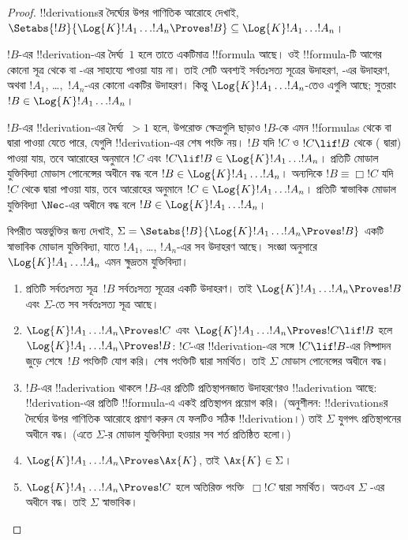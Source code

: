 \documentclass[../../../include/open-logic-section]{subfiles}
\begin{document}
\begin{proof}
  !!{derivation}sর দৈর্ঘ্যের উপর গাণিতিক আরোহে দেখাই,
  $\Setabs{!B}{\Log{K} !A_1 \dots !A_n \Proves !B} \subseteq
  \Log{K} !A_1 \dots !A_n$।

  $!B$-এর !!{derivation}-এর দৈর্ঘ্য~$1$ হলে তাতে একটিমাত্র !!{formula} আছে। ওই !!{formula}-টি আগের কোনো সূত্র থেকে \MP{} বা \Nec{}-এর সাহায্যে পাওয়া যায় না। তাই সেটি অবশ্যই সর্বতঃসত্য সূত্রের উদাহরণ, -এর উদাহরণ, অথবা $!A_1$, \dots,~$!A_n$-এর কোনো একটির উদাহরণ। কিন্তু $\Log{K}!A_1\dots!A_n$-তেও এগুলি আছে; সুতরাং $!B \in \Log{K}!A_1 \dots !A_n$।

  $!B$-এর !!{derivation}-এর দৈর্ঘ্য~$> 1$ হলে, উপরোক্ত ক্ষেত্রগুলি ছাড়াও $!B$-কে এমন !!{formula}s থেকে \MP{} বা \Nec{} দ্বারা পাওয়া যেতে পারে, যেগুলি !!{derivation}-এর শেষ পংক্তি নয়। $!B$ যদি $!C$ ও $!C \lif !B$ থেকে (\MP{} দ্বারা) পাওয়া যায়, তবে আরোহের অনুমানে $!C$ এবং $!C \lif !B \in \Log{K}!A_1 \dots !A_n$। প্রতিটি মোডাল যুক্তিবিদ্যা মোডাস পোনেন্সের অধীনে বদ্ধ বলে $!B \in \Log{K}!A_1 \dots !A_n$। অন্যদিকে $!B \equiv \Box !C$ যদি $!C$ থেকে \Nec{} দ্বারা পাওয়া যায়, তবে আরোহের অনুমানে $!C \in \Log{K}!A_1 \dots !A_n$। প্রতিটি স্বাভাবিক মোডাল যুক্তিবিদ্যা $\Nec$-এর অধীনে বদ্ধ বলে $!B \in \Log{K}!A_1\dots!A_n$।

  বিপরীত অন্তর্ভুক্তির জন্য দেখাই,
  $\Sigma = \Setabs{!B}{\Log{K} !A_1 \dots !A_n \Proves !B }$ একটি স্বাভাবিক মোডাল যুক্তিবিদ্যা, যাতে $!A_1$, \dots, $!A_n$-এর সব উদাহরণ আছে। সংজ্ঞা অনুসারে $\Log{K} !A_1 \dots !A_n$ এমন ক্ষুদ্রতম যুক্তিবিদ্যা।
  \begin{enumerate}
    \item প্রতিটি সর্বতঃসত্য সূত্র~$!B$ সর্বতঃসত্য সূত্রের একটি উদাহরণ। তাই $\Log{K}!A_1\dots!A_n \Proves !B$ এবং $\Sigma$-তে সব সর্বতঃসত্য সূত্র আছে।
    \item $\Log{K}!A_1\dots!A_n \Proves !C$ এবং $\Log{K}!A_1\dots!A_n \Proves !C \lif !B$ হলে $\Log{K}!A_1\dots!A_n \Proves !B$: $!C$-এর !!{derivation}-এর সঙ্গে $!C \lif !B$-এর নিষ্পাদন জুড়ে শেষে~$!B$ পংক্তিটি যোগ করি। শেষ পংক্তিটি \MP{} দ্বারা সমর্থিত। তাই $\Sigma$ মোডাস পোনেন্সের অধীনে বদ্ধ।
    \item $!B$-এর !!a{derivation} থাকলে $!B$-এর প্রতিটি প্রতিস্থাপনজাত উদাহরণেরও !!a{derivation} আছে: !!{derivation}-এর প্রতিটি !!{formula}-এ একই প্রতিস্থাপন প্রয়োগ করি। (অনুশীলন: !!{derivation}sর দৈর্ঘ্যের উপর গাণিতিক আরোহে প্রমাণ করুন যে ফলটিও সঠিক !!{derivation}।) তাই $\Sigma$ যুগপৎ প্রতিস্থাপনের অধীনে বদ্ধ। (এতে $\Sigma$-র মোডাল যুক্তিবিদ্যা হওয়ার সব শর্ত প্রতিষ্ঠিত হলো।)
    \item $\Log{K}!A_1\dots!A_n \Proves \Ax{K}$, তাই $\Ax{K} \in \Sigma$।
    \item $\Log{K}!A_1\dots!A_n \Proves !C$ হলে অতিরিক্ত পংক্তি~$\Box !C$ \Nec{} দ্বারা সমর্থিত। অতএব $\Sigma$ \Nec{}-এর অধীনে বদ্ধ। তাই $\Sigma$ স্বাভাবিক।
  \end{enumerate}
\end{proof}
\end{document}
